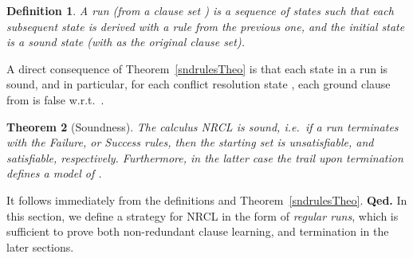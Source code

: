 \documentclass[a4paper]{article}
\newcommand{\startproof}{{\bf Proof:~}}
\newcommand{\finishproof}{{\bf Qed.}}
\newtheorem{defi}{Definition}[section]
\newtheorem{theo}[defi]{Theorem}
\begin{document}
{\begin{defi}
A \emph{run} (from a clause set ) is a sequence of states such that each subsequent state is derived with a rule from the previous one, and the initial state is a
sound state (with  as the original clause set).
\end{defi}

A direct consequence of Theorem~\ref{sndrulesTheo} is that each state in a run is sound, and in particular, for each conflict resolution state 
, each ground clause from  is false w.r.t.\ .



\begin{theo}[Soundness]\label{sndRunTheo}
The calculus NRCL is sound, i.e.\ if a run terminates with the \emph{Failure}, or \emph{Success} rules, 
then the starting set  is unsatisfiable, and satisfiable, respectively.
Furthermore, in the latter case the trail upon termination defines a model of .
\end{theo}
\noindent\startproof
It follows immediately from the definitions and Theorem~\ref{sndrulesTheo}.
\finishproof
In this section, we define a strategy for NRCL in the form of \emph{regular runs}, which is sufficient to prove both
non-redundant clause learning, and termination in the later sections. 

}
\end{document}
